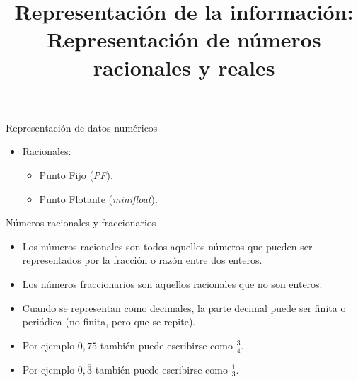 \documentclass[11pt,a4paper,spanish]{beamer}
\title{Representación de la información:\\
Representación de números racionales y reales}
\author{}
\date{}
\begin{document}
\begin{frame}[noframenumbering]
    \maketitle
    \centering
\end{frame}

\begin{frame}[label=temario]{Representación de datos numéricos}
\begin{itemize}
\item Racionales:
    \begin{itemize}
        \item Punto Fijo (\emph{PF}).
        \item Punto Flotante (\emph{minifloat}).
    \end{itemize}
\end{itemize}
\end{frame}

\begin{frame}{Números racionales y fraccionarios}
\begin{itemize}
    \item Los números racionales son todos aquellos números que pueden ser
        representados por la fracción o razón entre dos enteros.
    \item Los números fraccionarios son aquellos racionales que no son
        enteros.
    \item Cuando se representan como decimales, la parte decimal puede ser
        finita o periódica (no finita, pero que se repite).\pause
    \item Por ejemplo \(0,75\) también puede escribirse como \(\frac{3}{4}\).
    \item Por ejemplo \(0,\overline{3}\) también puede escribirse como
        \(\frac{1}{3}\).
\end{itemize}
\end{frame}
\end{document}
